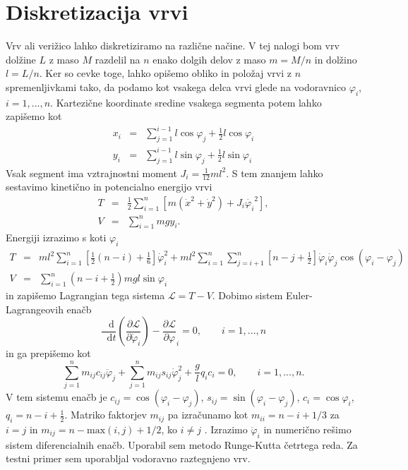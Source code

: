\documentclass[a4paper, 12pt, slovene]{article}
\newcommand*\diff{\mathop{}\!\mathrm{d}}
\numberwithin{equation}{section}
\newcommand{\pd}{\partial}
\newcommand{\Lag}{\mathcal{L}}
\begin{document}
\section{Diskretizacija vrvi}
Vrv ali verižico lahko diskretiziramo na različne načine. V tej nalogi bom vrv dolžine $L$ z maso $M$ razdelil na $n$ enako dolgih delov z maso $m=M/n$ in dolžino $l=L/n$. Ker so cevke toge, lahko opišemo obliko in položaj vrvi z $n$ spremenljivkami tako, da podamo kot vsakega delca vrvi glede na vodoravnico $\varphi_i$, $i = 1,..., n$. Kartezične  koordinate sredine vsakega segmenta potem lahko zapišemo kot
\begin{eqnarray}
x_i &=& \sum_{j=1}^{i-1}l\cos\varphi_j + \frac{1}{2}l\cos\varphi_i \\
y_i &=& \sum_{j=1}^{i-1}l\sin\varphi_j + \frac{1}{2}l\sin\varphi_i
\end{eqnarray}
Vsak segment ima vztrajnostni moment $J_i = \frac{1}{12} ml^2$. S tem znanjem lahko sestavimo kinetično in potencialno energijo vrvi
\begin{eqnarray}
T &=& \frac{1}{2}\sum_{i=1}^n \left[m(\dot{x}^2 + \dot{y}^2) + J_i\dot{\varphi_i}^2 \right], \\
V &=& \sum_{i=1}^n mgy_i.
\end{eqnarray}
Energiji izrazimo s koti $\varphi_i$ \cite{simplechainfall}
\begin{eqnarray}
T &=& ml^2\sum_{i=1}^n\left[\frac{1}{2}(n-i) + \frac{1}{6}\right]\dot{\varphi}_i^2 + ml^2\sum_{i=1}^n\sum_{j = i+1}^n \left[ n-j + \frac{1}{2} \right]\dot{\varphi}_i\dot{\varphi}_j\cos(\varphi_i - \varphi_j)	\\
V &=& \sum_{i=1}^n\left(n-i + \frac{1}{2}\right)mgl\sin\varphi_i
\end{eqnarray}
in zapišemo Lagrangian tega sistema $\Lag = T - V$. Dobimo sistem Euler-Lagrangeovih enačb
\begin{equation}
\frac{\diff }{\diff t}\left(\frac{\pd\Lag}{\pd\dot{\varphi}_i}\right) - \frac{\pd\Lag}{\pd\varphi}_i = 0, \qquad i=1,...,n
\end{equation}
in ga prepišemo kot
\begin{equation}
\sum_{j=1}^n m_{ij}c_{ij}\ddot{\varphi}_j + \sum_{j=1}^n m_{ij}s_{ij}\dot{\varphi}_j^2 + \frac{g}{l}q_ic_i = 0, \qquad i=1,...,n.
\label{eq:el-ketna-osn}
\end{equation}
V tem sistemu enačb je $c_{ij} = \cos(\varphi_i-\varphi_j)$, $s_{ij} = \sin(\varphi_i-\varphi_j)$, $c_i=\cos\varphi_i$, $q_i = n-i+\frac{1}{2}$. Matriko faktorjev $m_{ij}$ pa izračunamo kot $m_{ii} = n-i+1/3$ za $i=j$ in $m_{ij}=n-\mathrm{max}(i, j) +1/2$, ko $i\neq j$ \cite{simplechainfall}. Izrazimo $\ddot{\varphi}_i$ in numerično rešimo sistem diferencialnih enačb. Uporabil sem metodo Runge-Kutta četrtega reda. Za testni primer sem uporabljal vodoravno raztegnjeno vrv.
\end{document}
